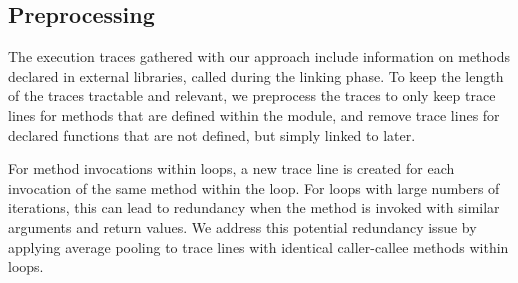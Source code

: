 \subsection{Preprocessing}
The execution traces gathered with our approach include information on methods declared in external libraries, called during the linking phase. To keep the length of the traces tractable and relevant, we preprocess the traces to only keep trace lines for methods that are defined within the module, and remove trace lines for declared functions that are not defined, but simply linked to later.

For method invocations within loops, a new trace line is created for each invocation of the same method within the loop. For loops with large numbers of iterations, this can lead to redundancy when the method is invoked with similar arguments and return values. We address this potential redundancy issue by applying average pooling to trace lines with identical caller-callee methods within loops.


